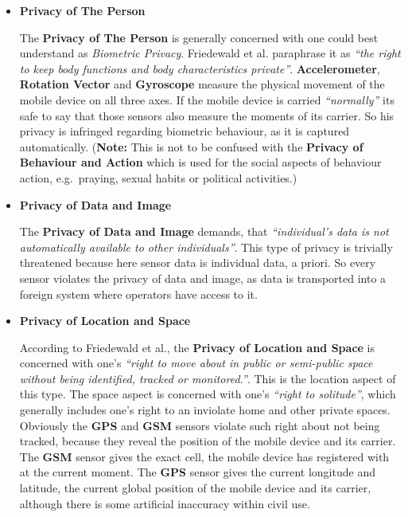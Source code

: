 \begin{itemize}

\item
\textbf{Privacy of The Person}

The \textbf{Privacy of The Person} is generally concerned with one could
best understand as \emph{Biometric Privacy}. Friedewald et al. paraphrase
it as \emph{``\om the right to keep body functions and body
characteristics \om private''}. \textbf{Accelerometer},
\textbf{Rotation Vector} and \textbf{Gyroscope} measure the physical
movement of the mobile device on all three axes. If the mobile device
is carried \emph{``normally''} its safe to say that those sensors also
measure the moments of its carrier. So his privacy is infringed
regarding biometric behaviour, as it is captured automatically.
(\textbf{Note:} This is not to be confused with the \textbf{Privacy of
Behaviour and Action} which is used for the social aspects of behaviour
action, e.g.~praying, sexual habits or political activities.)

\item
\textbf{Privacy of Data and Image}

The \textbf{Privacy of Data and Image} demands, that
\emph{``individual's data is not automatically available to other
individuals''}. This type of privacy is trivially threatened because
here sensor data is individual data, a priori. So every sensor violates
the privacy of data and image, as data is transported into a foreign
system where operators have access to it.


\item
\textbf{Privacy of Location and Space}

According to Friedewald et al., the \textbf{Privacy of Location and
Space} is concerned with one's \emph{``right to move about in public or
semi-public space without being identified, tracked or monitored.''}.
This is the location aspect of this type. The space aspect is concerned
with one's \emph{``right to solitude''}, which generally includes one's
right to an inviolate home and other private spaces. Obviously the
\textbf{GPS} and \textbf{GSM} sensors violate such right about not being
tracked, because they reveal the position of the mobile device and its
carrier. The \textbf{GSM} sensor gives the exact cell, the mobile device
has registered with at the current moment. The \textbf{GPS} sensor gives
the current longitude and latitude, the current global position of the
mobile device and its carrier, although there is some artificial
inaccuracy within civil use.


\end{itemize}
